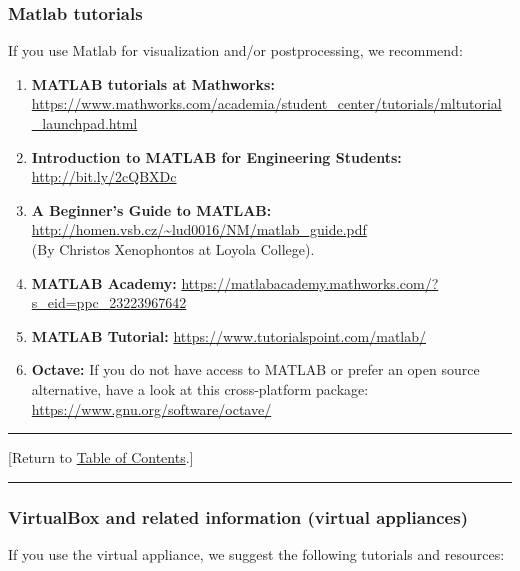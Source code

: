 \documentclass[12pt]{article}
\newcommand{\TOClink}{\begin{center}\hrule\vskip-10pt\phantom{.}\hfill[Return to \hyperlink{TOC}{Table of Contents}.]\hfill\phantom{.}\vskip3pt\hrule\end{center}}
\begin{document}
\subsubsection{Matlab tutorials}
If you use Matlab for visualization and/or postprocessing, we recommend:

\begin{enumerate}

\item 
\textbf{MATLAB tutorials at Mathworks:} \hfill\break
\href{https://www.mathworks.com/academia/student_center/tutorials/mltutorial_launchpad.html}{https://www.mathworks.com/academia/student\_center/tutorials/mltutorial\_launchpad.html}

\item 
\textbf{Introduction to MATLAB for Engineering Students:} \href{https://www.mccormick.northwestern.edu/documents/students/undergraduate/introduction-to-matlab.pdf
}{http://bit.ly/2cQBXDc}

\item 
\textbf{A Beginner's Guide to MATLAB: } 
\href{http://homen.vsb.cz/~lud0016/NM/matlab_guide.pdf}{http://homen.vsb.cz/\~{}lud0016/NM/matlab\_guide.pdf
} \\ 
(By Christos Xenophontos at Loyola College).

\item 
\textbf{MATLAB Academy:} 
\href{https://matlabacademy.mathworks.com/?s_eid=ppc_23223967642}{https://matlabacademy.mathworks.com/?s\_eid=ppc\_23223967642}

\item 
\textbf{MATLAB Tutorial:} 
\href{https://www.tutorialspoint.com/matlab/}{https://www.tutorialspoint.com/matlab/}

\item 
\textbf{Octave:} If you do not have access to MATLAB or prefer an open source 
alternative, have a look at this cross-platform package: \\
\href{https://www.gnu.org/software/octave/}{https://www.gnu.org/software/octave/} 

\end{enumerate}
\TOClink 

\subsubsection{VirtualBox and related information (virtual appliances)}
If you use the virtual appliance, we suggest the following tutorials and resources: 
\end{document}
